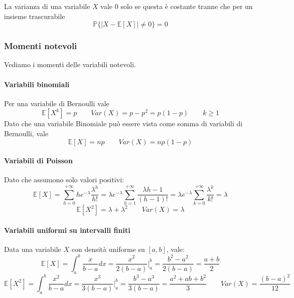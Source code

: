 \begin{observation}
	La varianza di una variabile $X$ vale $0$ solo se questa è costante tranne che per un insieme trascurabile
	\begin{equation*}
		\mathbb{P}\{\lvert X - \mathbb{E}[X] \rvert \neq 0\} = 0
	\end{equation*}
\end{observation}

\subsubsection{Momenti notevoli}
Vediamo i momenti delle variabili notevoli.
\paragraph{Variabili binomiali}
Per una variabile di Bernoulli vale
\begin{equation}
	\mathbb{E}[X^k] = p \quad\quad Var(X)=p-p^2=p(1-p) \quad\quad k \geq 1
\end{equation}
Dato che una variabile Binomiale può essere vista come somma di variabili di Bernoulli, vale
\begin{equation}
	\mathbb{E}[X] = np \quad\quad Var(X) = np(1-p)
\end{equation}

\paragraph{Variabili di Poisson}
Dato che assumono solo valori positivi:
\begin{equation}
	\mathbb{E}[X] = \sum_{h=0}^{+\infty}he^{-\lambda}\frac{\lambda^h}{h!} = \lambda e^{-\lambda}\sum_{h=1}^{+\infty}\frac{\lambda{h-1}}{(h-1)!} = \lambda e^{-\lambda}\sum_{k=0}^{+\infty}\frac{\lambda^k}{k!}=\lambda
\end{equation}
\begin{equation}
	\mathbb{E}[X^2]=\lambda + \lambda^2 \quad\quad Var(X)=\lambda
\end{equation}

\paragraph{Variabili uniformi su intervalli finiti}
Data una variabile $X$ con densità uniforme su $[a,b]$, vale:
\begin{equation}
	\mathbb{E}[X] = \int_{a}^{b}\frac{x}{b-a}dx = \frac{x^2}{2(b-a)}\bigg\vert^b_a = \frac{b^2-a^2}{2(b-a)}=\frac{a+b}{2}
\end{equation}
\begin{equation}
	\mathbb{E}[X^2] = \int_{a}^{b}\frac{x^2}{b-a}dx = \frac{x^3}{3(b-a)}\bigg\vert^b_a = \frac{b^3-a^3}{3(b-a)}=\frac{a^2+ab+b^2}{3} \quad\quad Var(X) = \frac{(b-a)^2}{12}
\end{equation}

